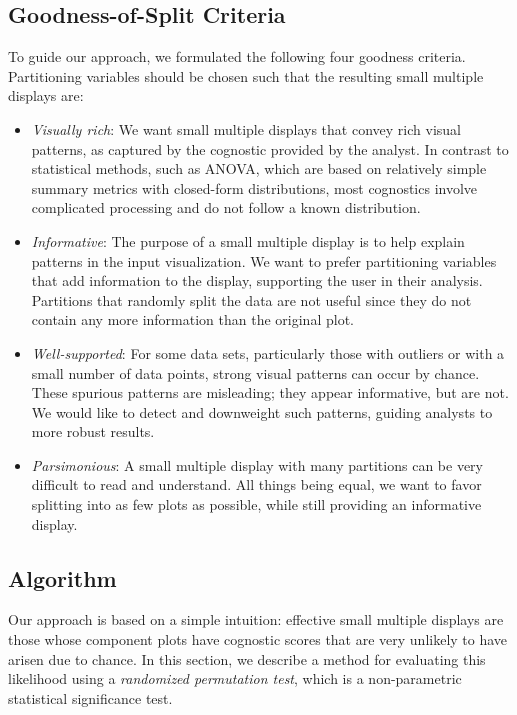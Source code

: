 \subsection{Goodness-of-Split Criteria}
To guide our approach, we formulated the following four goodness criteria. Partitioning variables should be chosen such that the resulting small multiple displays are:
\begin{itemize}
\item \emph{Visually rich}: We want small multiple displays that convey rich visual patterns, as captured by the cognostic provided by the analyst. In contrast to statistical methods, such as ANOVA, which are based on relatively simple summary metrics with closed-form distributions, most cognostics involve complicated processing and do not follow a known distribution.

\item \emph{Informative}: The purpose of a small multiple display is to help explain patterns in the input visualization. We want to prefer partitioning variables that add information to the display, supporting the user in their analysis. Partitions that randomly split the data are not useful since they do not contain any more information than the original plot.

\item \emph{Well-supported}: For some data sets, particularly those with outliers or with a small number of data points, strong visual patterns can occur by chance. These spurious patterns are misleading; they appear informative, but are not. We would like to detect and downweight such  patterns, guiding analysts to more robust results.

\item \emph{Parsimonious}: A small multiple display with many partitions can be very difficult to read and understand. All things being equal, we want to favor splitting into as few plots as possible, while still providing an informative display.
\end{itemize}

\subsection{Algorithm}

Our approach is based on a simple intuition: effective small multiple displays are those whose component plots have cognostic scores that are very unlikely to have arisen due to chance. In this section, we describe a method for evaluating this likelihood using a \emph{randomized permutation test}, which is a non-parametric statistical significance test.

